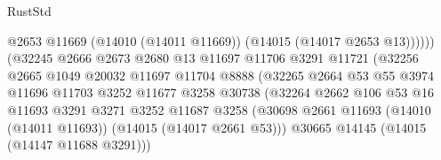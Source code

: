 \begin{lexlean}{RustStd}
\begin{coremodule}
                                              @2653
                                              @11669
                                              (@14010 (@14011 @11669))
                                              (@14015 (@14017 @2653 @13))))))
                                      (@32245
                                        @2666
                                        @2673
                                        @2680
                                        @13
                                        @11697
                                        @11706
                                        @3291
                                        @11721
                                        (@32256
                                          @2665
                                          @1049
                                          @20032
                                          @11697
                                          @11704
                                          @8888
                                          (@32265
                                            @2664
                                            @53
                                            @55
                                            @3974
                                            @11696
                                            @11703
                                            @3252
                                            @11677
                                            @3258
                                            @30738
                                            (@32264
                                              @2662
                                              @106
                                              @53
                                              @16
                                              @11693
                                              @3291
                                              @3271
                                              @3252
                                              @11687
                                              @3258
                                              (@30698
                                                @2661
                                                @11693
                                                (@14010 (@14011 @11693))
                                                (@14015 (@14017 @2661 @53)))
                                              @30665
                                              @14145
                                              (@14015 (@14147 @11688 @3291)))

\end{coremodule}
\end{lexlean}
